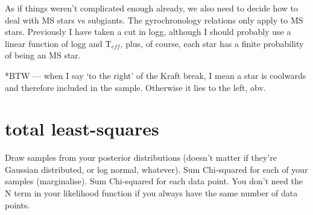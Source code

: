 \documentclass[12pt,preprint]{aastex}
\begin{document}
As if things weren't complicated enough already, we also need to decide how to deal with MS stars vs subgiants.
The gyrochronology relations only apply to MS stars.
Previously I have taken a cut in logg, although I should probably use a linear function of logg and T$_{eff}$, plus, of course, each star has a finite probability of being an MS star.

*BTW --- when I say `to the right' of the Kraft break, I mean a star is coolwards and therefore included in the sample.
Otherwise it lies to the left, obv.

\section{total least-squares}

Draw samples from your posterior distributions (doesn't matter if they're Gaussian distributed, or log normal, whatever).
Sum Chi-squared for each of your samples (marginalise).
Sum Chi-squared for each data point.
You don't need the N term in your likelihood function if you always have the same number of data points.
\end{document}
